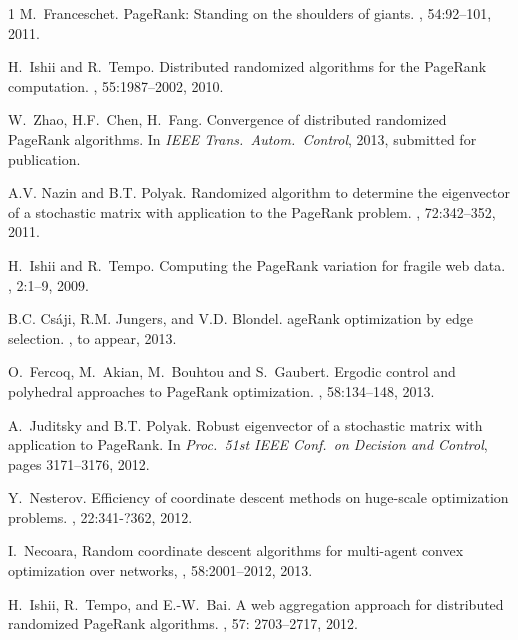 \documentclass[11pt,draftcls,onecolumn]{IEEEtran}
\begin{document}
\begin{thebibliography}{1}
M.~Franceschet.
\newblock Page{R}ank: Standing on the shoulders of giants.
, 54:92--101, 2011.

H.~Ishii and R.~Tempo.
\newblock Distributed randomized algorithms for the {P}age{R}ank computation.
, 55:1987--2002, 2010.

W.~Zhao, H.{\;}F.~Chen, H.~Fang.
\newblock Convergence of distributed randomized {P}age{R}ank algorithms.
\newblock In {\em IEEE Trans.\ Auto\-m.\ Control}, 2013, submitted for publication.

A.{\;}V. Nazin and B.{\;}T. Polyak.
\newblock Randomized algorithm to determine the eigenvector of a stochastic
  matrix with application to the {P}age{R}ank problem.
, 72:342--352, 2011.

H.~Ishii and R.~Tempo.
\newblock Computing the {P}age{R}ank variation for fragile web data.
, 2:1--9,
2009.

B.{\;}C. Cs\'{a}ji, R.{\;}M. Jungers, and V.{\;}D. Blondel.
age{R}ank optimization by edge selection.
, to appear, 2013.

O.~Fercoq, M.~Akian, M.~Bouhtou and S.~Gaubert.
\newblock Ergodic control and polyhedral approaches to PageRank optimization.
, 58:134--148, 2013.

A.~Juditsky and B.{\;}T. Polyak.
\newblock Robust eigenvector of a stochastic matrix with application to PageRank.
In {\em Proc.\ {\rm 51}st IEEE Conf.\ on Decision and Control}, 
pages 3171--3176,  2012.

Y.~Nesterov.
\newblock Efficiency of coordinate descent methods on huge-scale 
optimization problems.
, 22:341-?362, 2012.

I.~Necoara, 
\newblock Random coordinate descent algorithms for multi-agent convex 
optimization over networks,
, 58:2001--2012, 2013.



H.~Ishii, R.~Tempo, and E.-W.~Bai.
\newblock 
A web aggregation approach for distributed randomized PageRank algorithms.
, 57: 2703--2717, 2012.


\end{thebibliography}
\end{document}

